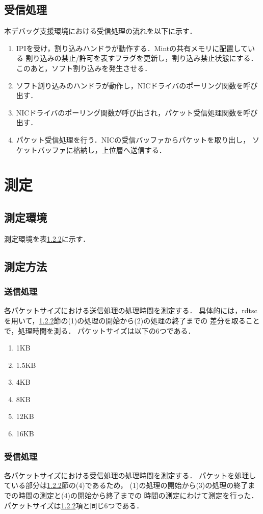\documentclass[12pt]{jsarticle}
\begin{document}
\subsection{受信処理}
本デバッグ支援環境における受信処理の流れを以下に示す．
\begin{enumerate}
    \item IPIを受け，割り込みハンドラが動作する．Mintの共有メモリに配置している
        割り込みの禁止/許可を表すフラグを更新し，割り込み禁止状態にする．
        このあと，ソフト割り込みを発生させる．
    \item ソフト割り込みのハンドラが動作し，NICドライバのポーリング関数を呼び出す．
    \item NICドライバのポーリング関数が呼び出され，パケット受信処理関数を呼び出す．
    \item パケット受信処理を行う．NICの受信バッファからパケットを取り出し，
        ソケットバッファに格納し，上位層へ送信する．
\end{enumerate}

\section{測定}
\subsection{測定環境}
測定環境を表\ref{}に示す．

\subsection{測定方法}
\subsubsection{送信処理}
各パケットサイズにおける送信処理の処理時間を測定する．
具体的には，rdtscを用いて，\ref{}節の(1)の処理の開始から(2)の処理の終了までの
差分を取ることで，処理時間を測る．
パケットサイズは以下の6つである．
\begin{enumerate}
    \item 1KB
    \item 1.5KB
    \item 4KB
    \item 8KB
    \item 12KB
    \item 16KB
\end{enumerate}

\subsubsection{受信処理}
各パケットサイズにおける受信処理の処理時間を測定する．
パケットを処理している部分は\ref{}節の(4)であるため，
(1)の処理の開始から(3)の処理の終了までの時間の測定と(4)の開始から終了までの
時間の測定にわけて測定を行った．
パケットサイズは\ref{}項と同じ6つである．
\end{document}
